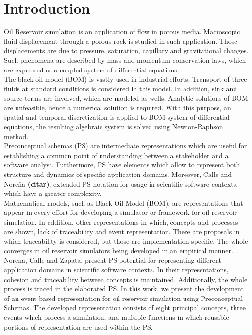 \documentclass[review]{elsarticle}
\begin{document}
\linenumbers

\section{Introduction}
Oil Reservoir simulation is an application of flow in porous media. Macroscopic fluid displacement through a porous rock is studied in such application. Those displacements are due to pressure, saturation, capillary and gravitational changes. Such phenomena are described by mass and momentum conservation laws, which are expressed as a coupled system of differential equations.\\

The black oil model (BOM) is vastly used in industrial efforts. Transport of three fluids at standard conditions is considered in this model. In addition, sink and source terms are involved, which are modeled as wells. Analytic solutions of BOM are unfeasible, hence a numerical solution is required. With this purpose, an spatial and temporal discretization is applied to BOM system of differential equations, the resulting algebraic system is solved using Newton-Raphson method.\\

Preconceptual schemas (PS) are intermediate representations which are useful for establishing a common point of understanding between a stakeholder and a software analyst. Furthermore, PS have elements which allow to represent both structure and dynamics of specific application domains. Moreover, Calle and Nore\~na {\color{red} \textbf{(citar)}}, extended PS notation for usage in scientific software contexts, which have a greater complexity.\\

Mathematical models, such as Black Oil Model (BOM), are representations that appear in every effort for developing a simulator or framework for oil reservoir simulation. In addition, other representations in which, concepts and processes are shown, lack of traceability and event representation. There are proposals in which traceability is considered, but those are implementation-specific. The whole converges in oil reservoir simulators being developed in an empirical manner.\\

Norena, Calle and Zapata, present PS potential for representing different application domains in scientific software contexts. In their representations, cohesion and traceability between concepts is maintained. Additionally, the whole process is traced in the elaborated PS. In this work, we present the development of an event based representation for oil reservoir simulation using Preconceptual Schemas. The developed representation consists of eight principal concepts, three events which process a simulation, and multiple functions in which reusable portions of representation are used within the PS.
\end{document}
